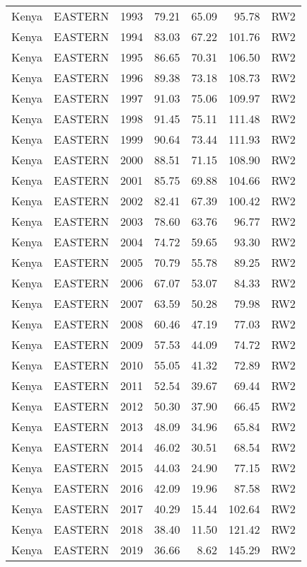 \begin{longtable}{lllrrrl}
  Kenya & EASTERN & 1993 & 79.21 & 65.09 & 95.78 & RW2 \\ 
  Kenya & EASTERN & 1994 & 83.03 & 67.22 & 101.76 & RW2 \\ 
  Kenya & EASTERN & 1995 & 86.65 & 70.31 & 106.50 & RW2 \\ 
  Kenya & EASTERN & 1996 & 89.38 & 73.18 & 108.73 & RW2 \\ 
  Kenya & EASTERN & 1997 & 91.03 & 75.06 & 109.97 & RW2 \\ 
  Kenya & EASTERN & 1998 & 91.45 & 75.11 & 111.48 & RW2 \\ 
  Kenya & EASTERN & 1999 & 90.64 & 73.44 & 111.93 & RW2 \\ 
  Kenya & EASTERN & 2000 & 88.51 & 71.15 & 108.90 & RW2 \\ 
  Kenya & EASTERN & 2001 & 85.75 & 69.88 & 104.66 & RW2 \\ 
  Kenya & EASTERN & 2002 & 82.41 & 67.39 & 100.42 & RW2 \\ 
  Kenya & EASTERN & 2003 & 78.60 & 63.76 & 96.77 & RW2 \\ 
  Kenya & EASTERN & 2004 & 74.72 & 59.65 & 93.30 & RW2 \\ 
  Kenya & EASTERN & 2005 & 70.79 & 55.78 & 89.25 & RW2 \\ 
  Kenya & EASTERN & 2006 & 67.07 & 53.07 & 84.33 & RW2 \\ 
  Kenya & EASTERN & 2007 & 63.59 & 50.28 & 79.98 & RW2 \\ 
  Kenya & EASTERN & 2008 & 60.46 & 47.19 & 77.03 & RW2 \\ 
  Kenya & EASTERN & 2009 & 57.53 & 44.09 & 74.72 & RW2 \\ 
  Kenya & EASTERN & 2010 & 55.05 & 41.32 & 72.89 & RW2 \\ 
  Kenya & EASTERN & 2011 & 52.54 & 39.67 & 69.44 & RW2 \\ 
  Kenya & EASTERN & 2012 & 50.30 & 37.90 & 66.45 & RW2 \\ 
  Kenya & EASTERN & 2013 & 48.09 & 34.96 & 65.84 & RW2 \\ 
  Kenya & EASTERN & 2014 & 46.02 & 30.51 & 68.54 & RW2 \\ 
  Kenya & EASTERN & 2015 & 44.03 & 24.90 & 77.15 & RW2 \\ 
  Kenya & EASTERN & 2016 & 42.09 & 19.96 & 87.58 & RW2 \\ 
  Kenya & EASTERN & 2017 & 40.29 & 15.44 & 102.64 & RW2 \\ 
  Kenya & EASTERN & 2018 & 38.40 & 11.50 & 121.42 & RW2 \\ 
  Kenya & EASTERN & 2019 & 36.66 & 8.62 & 145.29 & RW2 \\ 

\end{longtable}
